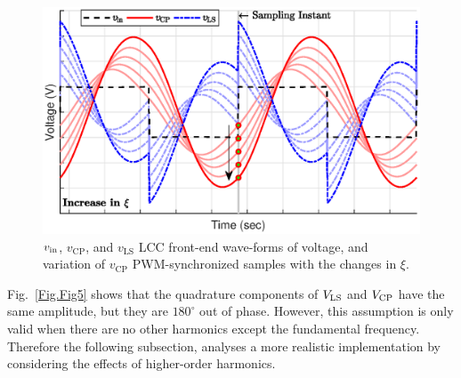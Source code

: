 \documentclass[journal,a4paper]{IEEEtran}
\begin{document}
\begin{figure}[t!]
\begin{center}
	\includegraphics[clip, trim=1cm 0.0cm 1cm 0.0cm, width=1\columnwidth]{Figs/Fig6.eps}
\end{center}
\vspace{-0.2cm}
	\caption{$v_\textrm{\rm in}$, $v_\textrm{CP}$, and $v_\textrm{LS}$ LCC front-end wave-forms of voltage, and variation of $v_\textrm{CP}$ PWM-synchronized samples with the changes in $\xi$.}
		\label{Fig.Fig6}
		\vspace{-3mm}
\end{figure}
Fig.~\ref{Fig.Fig5} shows that the quadrature components of $V_{\rm LS}$ and $V_{\rm CP}$ have the same amplitude, but they are $180^\circ$ out of phase. However, this assumption is only valid when there are no other harmonics except the fundamental frequency. Therefore the following subsection, analyses a more realistic implementation by considering the effects of higher-order harmonics. 
\end{document}
